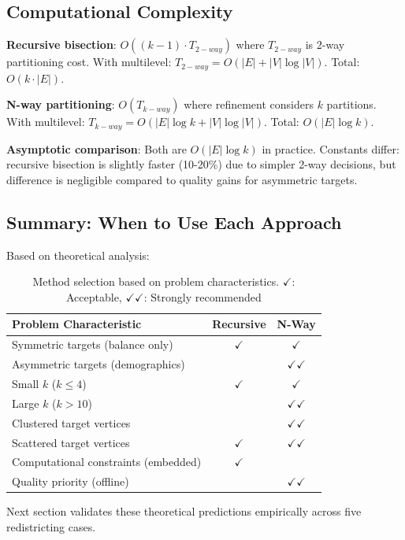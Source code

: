 \subsection{Computational Complexity}

\textbf{Recursive bisection}: $O((k-1) \cdot T_{2-way})$ where $T_{2-way}$ is 2-way partitioning cost. With multilevel: $T_{2-way} = O(|E| + |V| \log |V|)$. Total: $O(k \cdot |E|)$.

\textbf{N-way partitioning}: $O(T_{k-way})$ where refinement considers $k$ partitions. With multilevel: $T_{k-way} = O(|E| \log k + |V| \log |V|)$. Total: $O(|E| \log k)$.

\textbf{Asymptotic comparison}: Both are $O(|E| \log k)$ in practice. Constants differ: recursive bisection is slightly faster (10-20\%) due to simpler 2-way decisions, but difference is negligible compared to quality gains for asymmetric targets.

\subsection{Summary: When to Use Each Approach}

Based on theoretical analysis:

\begin{table}[h]
\centering
\begin{tabular}{lcc}
\toprule
\textbf{Problem Characteristic} & \textbf{Recursive} & \textbf{N-Way} \\
\midrule
Symmetric targets (balance only) & $\checkmark$ & $\checkmark$ \\
Asymmetric targets (demographics) & & $\checkmark \checkmark$ \\
Small $k$ ($k \leq 4$) & $\checkmark$ & $\checkmark$ \\
Large $k$ ($k > 10$) & & $\checkmark \checkmark$ \\
Clustered target vertices & & $\checkmark \checkmark$ \\
Scattered target vertices & $\checkmark$ & $\checkmark \checkmark$ \\
Computational constraints (embedded) & $\checkmark$ & \\
Quality priority (offline) & & $\checkmark \checkmark$ \\
\bottomrule
\end{tabular}
\caption{Method selection based on problem characteristics. $\checkmark$: Acceptable, $\checkmark \checkmark$: Strongly recommended}
\label{tab:method_selection}
\end{table}

Next section validates these theoretical predictions empirically across five redistricting cases.
